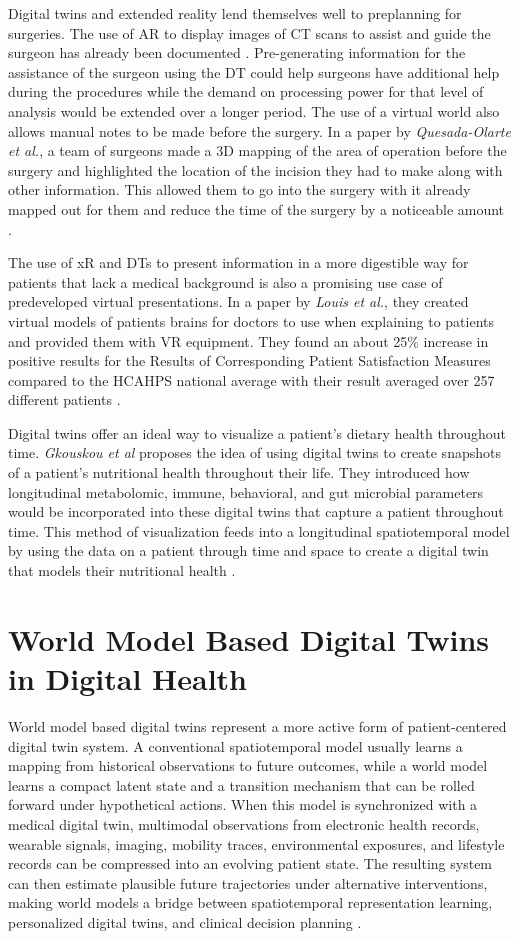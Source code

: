 \documentclass[acmsmall]{acmart}
\begin{document}
Digital twins and extended reality lend themselves well to preplanning for surgeries. The use of AR to display images of CT scans to assist and guide the surgeon has already been documented \cite{RN139}. Pre-generating information for the assistance of the surgeon using the DT could help surgeons have additional help during the procedures while the demand on processing power for that level of analysis would be extended over a longer period. The use of a virtual world also allows manual notes to be made before the surgery. In a paper by \textit{Quesada-Olarte et al.}, a team of surgeons made a 3D mapping of the area of operation before the surgery and highlighted the location of the incision they had to make along with other information. This allowed them to go into the surgery with it already mapped out for them and reduce the time of the surgery by a noticeable amount \cite{RN137}.

The use of xR and DTs to present information in a more digestible way for patients that lack a medical background is also a promising use case of predeveloped virtual presentations. In a paper by \textit{Louis et al.}, they created virtual models of patients brains for doctors to use when explaining to patients and provided them with VR equipment. They found an about 25\% increase in positive results for the Results of Corresponding Patient Satisfaction Measures compared to the HCAHPS national average with their result averaged over 257 different patients \cite{RN140}.

Digital twins offer an ideal way to visualize a patient’s dietary health throughout time. \textit{Gkouskou et al} proposes the idea of using digital twins to create snapshots of a patient's nutritional health throughout their life. They introduced how longitudinal metabolomic, immune, behavioral, and gut microbial parameters would be incorporated into these digital twins that capture a patient throughout time. This method of visualization feeds into a longitudinal spatiotemporal model by using the data on a patient through time and space to create a digital twin that models their nutritional health \cite{gkouskou2020virtual}.

\section{World Model Based Digital Twins in Digital Health}
\label{sec:world_model_dt}
World model based digital twins represent a more active form of patient-centered digital twin system. A conventional spatiotemporal model usually learns a mapping from historical observations to future outcomes, while a world model learns a compact latent state and a transition mechanism that can be rolled forward under hypothetical actions. When this model is synchronized with a medical digital twin, multimodal observations from electronic health records, wearable signals, imaging, mobility traces, environmental exposures, and lifestyle records can be compressed into an evolving patient state. The resulting system can then estimate plausible future trajectories under alternative interventions, making world models a bridge between spatiotemporal representation learning, personalized digital twins, and clinical decision planning \cite{Zheng2026DTtoWM}.
\end{document}
